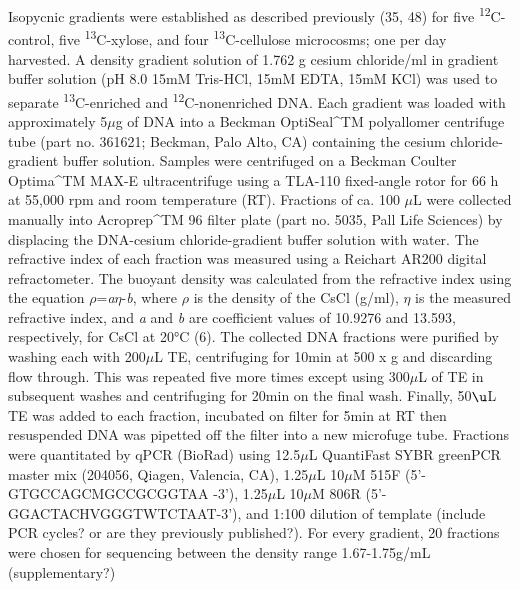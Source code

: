  Isopycnic gradients were established as described previously (35, 48) for five \textsuperscript{12}C-control, five \textsuperscript{13}C-xylose, and four \textsuperscript{13}C-cellulose microcosms; one per day harvested. A density gradient solution of 1.762 g cesium chloride/ml in gradient buffer solution (pH 8.0 15mM Tris-HCl, 15mM EDTA, 15mM KCl) was used to separate \textsuperscript{13}C-enriched and \textsuperscript{12}C-nonenriched DNA. Each gradient was loaded with approximately 5$\mu$g of DNA into a Beckman OptiSeal^{TM} polyallomer centrifuge tube (part no. 361621; Beckman, Palo Alto, CA) containing the cesium chloride-gradient buffer solution. Samples were centrifuged on a Beckman Coulter Optima^{TM} MAX-E ultracentrifuge using a TLA-110 fixed-angle rotor for 66 h at 55,000 rpm and room temperature (RT). Fractions of ca. 100 $\mu$L were collected manually into Acroprep^{TM} 96 filter plate (part no. 5035, Pall Life Sciences) by displacing the DNA-cesium chloride-gradient buffer solution with water. The refractive index of each fraction was measured using a Reichart AR200 digital refractometer. The buoyant density was calculated from the refractive index using the equation $\rho$=\textit{a}$\eta$-\textit{b}, where $\rho$ is the density of the CsCl (g/ml), $\eta$ is the measured refractive index, and \textit{a} and \textit{b} are coefficient values of 10.9276 and 13.593, respectively, for CsCl at 20°C (6).  The collected DNA fractions were purified by washing each with 200$\mu$L TE, centrifuging for 10min at 500 x g and discarding flow through.  This was repeated five more times except using 300$\mu$L of TE in subsequent washes and centrifuging for 20min on the final wash.  Finally, 50$\u$L TE was added to each fraction, incubated on filter for 5min at RT then resuspended DNA was pipetted off the filter into a new microfuge tube.   Fractions were quantitated by qPCR (BioRad) using 12.5$\mu$L QuantiFast  SYBR greenPCR  master mix (204056, Qiagen, Valencia, CA), 1.25$\mu$L 10$\mu$M 515F (5'-GTGCCAGCMGCCGCGGTAA -3'), 1.25$\mu$L 10$\mu$M 806R (5'-GGACTACHVGGGTWTCTAAT-3'), and 1:100 dilution of template (include PCR cycles? or are they previously published?). For every gradient, 20 fractions were chosen for sequencing between the density range 1.67-1.75g/mL (supplementary?)     


